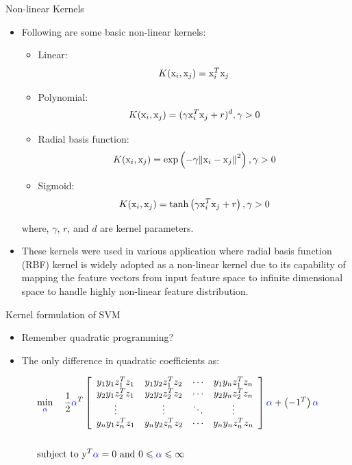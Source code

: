 \begin{frame}{Non-linear Kernels}
\begin{itemize}
\item Following are some basic non-linear kernels:
\begin{itemize}
\item Linear: 
\[{K({{{\rm x}}_i},{{{\rm x}}_j}) = {\rm x}_i^{T}{{\rm x}_j}}\]
\item Polynomial: 
\[K({{\rm x}_i},{{\rm x}_j}) = {({\gamma} {\rm x}_i^{T}{{\rm x}_j} + r)^{d}},{\gamma}  > 0\]
\item Radial basis function: 
\[K({{\rm x}_i},{{\rm x}_j}) = \exp \left( { - {\gamma} {{\left\| {{{\rm x}_i} - {{\rm x}_j}} \right\|}^2}} \right),{\gamma}  > 0\]
\item Sigmoid: 
\[K({{\rm x}_i},{{\rm x}_j}) = \tanh \left( {{\gamma} {\rm x}_i^{T}{{\rm x}_j} + r} \right),{\gamma}  > 0\]
\end{itemize}
where, $\gamma$, $r$, and $d$  are kernel parameters. 
\item These kernels were used in various application
where radial basis function (RBF) kernel is widely adopted as a non-linear kernel due to its capability of mapping the feature vectors from input feature space to infinite dimensional space to handle highly non-linear feature distribution.
\end{itemize}
\end{frame}

\begin{frame}{Kernel formulation of SVM}
\begin{itemize}
\item Remember quadratic programming?
\item The only difference  in quadratic coefficients as:
\end{itemize}
\[\begin{gathered}
  \mathop {\min }\limits_{\color{blue}\alpha}  ~~~ \frac{1}{2}{{\color{blue}\alpha}  ^T}\left[ {\begin{array}{*{20}{c}}
  {{y_1}{y_1}z_1^T{z_1}}&{{y_1}{y_2}z_1^T{z_2}}&{\cdots}&{{y_1}{y_n}z_1^T{z_n}} \\ 
  {{y_2}{y_1}z_2^T{z_1}}&{{y_2}{y_2}z_2^T{z_2}}&{\cdots}&{{y_2}{y_n}z_2^T{z_n}} \\ 
  {\vdots}&{\vdots}&{\ddots}&{\vdots} \\ 
  {{y_n}{y_1}z_n^T{z_1}}&{{y_n}{y_2}z_n^T{z_2}}&{\cdots}&{{y_n}{y_n}z_n^T{z_n}} 
\end{array}} \right]{\color{blue}\alpha}  + \left( { - {1^T}} \right){\color{blue}\alpha}  \hfill \\\\
  \text{subject to   }{{\rm y}^T}{\color{blue}\alpha}   = 0\text{   and   }0 \leqslant {\color{blue}\alpha}   \leqslant \infty  \hfill \\ 
\end{gathered} \]
\end{frame}


